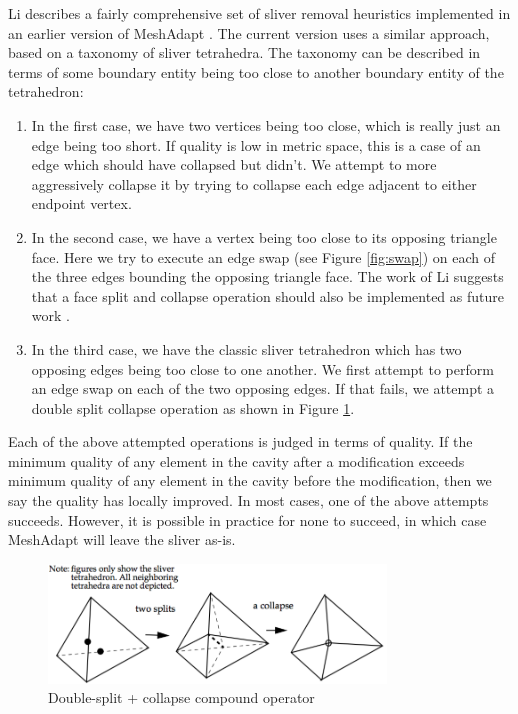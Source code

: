 Li describes a fairly comprehensive set of sliver removal
heuristics implemented in an earlier version of MeshAdapt
\cite{li2003mesh}.
The current version uses a similar approach, based on a
taxonomy of sliver tetrahedra.
The taxonomy can be described in terms of some boundary
entity being too close to another boundary entity
of the tetrahedron:
\begin{enumerate}
\item In the first case, we have two vertices being too
close, which is really just an edge being too short.
If quality is low in metric space, this is a case
of an edge which should have collapsed but didn't.
We attempt to more aggressively collapse it by trying
to collapse each edge adjacent to either endpoint vertex.
\item In the second case, we have a vertex being too close
to its opposing triangle face.
Here we try to execute an edge swap (see Figure \ref{fig:swap})
on each of the three edges bounding the opposing triangle face.
The work of Li suggests that a face split and collapse operation
should also be implemented as future work \cite{li2003mesh}.
\item In the third case, we have the classic sliver tetrahedron
which has two opposing edges being too close to one another.
We first attempt to perform an edge swap on each of the two
opposing edges.
If that fails, we attempt a double split collapse operation
as shown in Figure \ref{fig:compound}.
\end{enumerate}
Each of the above attempted operations is judged in terms of quality.
If the minimum quality of any element in the cavity after a modification
exceeds minimum quality of any element in the cavity before the
modification, then we say the quality has locally improved.
In most cases, one of the above attempts succeeds.
However, it is possible in practice for none to succeed, in which
case MeshAdapt will leave the sliver as-is.

\begin{figure}
\begin{center}
\includegraphics[width=0.8\textwidth]{split_collapse.png}
\caption{Double-split + collapse compound operator
\cite{li2003mesh}}
\label{fig:compound}
\end{center}
\end{figure}

